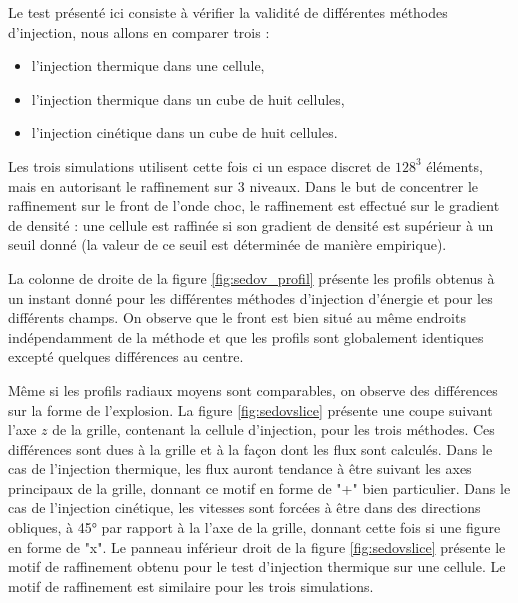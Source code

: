 Le test présenté ici consiste à vérifier la validité de différentes méthodes d'injection, nous allons en comparer trois : 
\begin{itemize}
\item l'injection thermique dans une cellule,
\item l'injection thermique dans un cube de huit cellules,
\item l'injection cinétique dans un cube de huit cellules.
\end{itemize}

Les trois simulations utilisent cette fois ci un espace discret de $128^3$ éléments, mais en autorisant le raffinement sur 3 niveaux.
Dans le but de concentrer le raffinement sur le front de l'onde choc, le raffinement est effectué sur le gradient de densité : une cellule est raffinée si son gradient de densité est supérieur à un seuil donné (la valeur de ce seuil est déterminée de manière empirique).

La colonne de droite de la figure \ref{fig:sedov_profil} présente les profils obtenus à un instant donné pour les différentes méthodes d'injection d'énergie et pour les différents champs.
On observe que le front est bien situé au même endroits indépendamment de la méthode et que les profils sont globalement identiques excepté quelques différences au centre.

Même si les profils radiaux moyens sont comparables, on observe des différences sur la forme de l'explosion.
La figure \ref{fig:sedovslice} présente une coupe suivant l'axe $z$ de la grille, contenant la cellule d'injection, pour les trois méthodes.
Ces différences sont dues à la grille et à la façon dont les flux sont calculés.
Dans le cas de l'injection thermique, les flux auront tendance à être suivant les axes principaux de la grille, donnant ce motif en forme de "+" bien particulier.
Dans le cas de l'injection cinétique, les vitesses sont forcées à être dans des directions obliques, à 45° par rapport à la l'axe de la grille, donnant cette fois si une figure en forme de "x".
Le panneau inférieur droit de la figure \ref{fig:sedovslice} présente le motif de raffinement obtenu pour le test d'injection thermique sur une cellule.
Le motif de raffinement est similaire pour les trois simulations.

